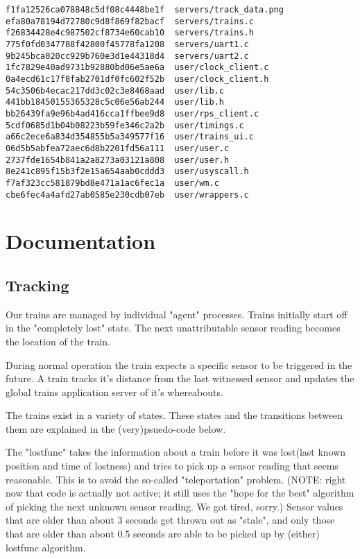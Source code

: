 \documentclass{article}
\begin{document}
\begin{verbatim}
f1fa12526ca078848c5df08c4448be1f  servers/track_data.png
efa80a78194d72780c9d8f869f82bacf  servers/trains.c
f26834428e4c987502cf8734e60cab10  servers/trains.h
775f0fd0347788f42800f45778fa1208  servers/uart1.c
9b245bca020cc929b760e3d1e44318d4  servers/uart2.c
1fc7829e40ad9731b92880bd06e5ae6a  user/clock_client.c
0a4ecd61c17f8fab2701df0fc602f52b  user/clock_client.h
54c3506b4ecac217dd3c02c3e8468aad  user/lib.c
441bb18450155365328c5c06e56ab244  user/lib.h
bb26439fa9e96b4ad416cca1ffbee9d8  user/rps_client.c
5cdf0685d1b04b08223b59fe346c2a2b  user/timings.c
a66c2ece6a834d354855b5a349577f16  user/trains_ui.c
06d5b5abfea72aec6d8b2201fd56a111  user/user.c
2737fde1654b841a2a8273a03121a808  user/user.h
8e241c895f15b3f2e15a654aab0cddd3  user/usyscall.h
f7af323cc581879bd8e471a1ac6fec1a  user/wm.c
cbe6fec4a4afd27ab0585e230cdb07eb  user/wrappers.c
\end{verbatim}

\section{Documentation}

\subsection{Tracking}

Our trains are managed by individual "agent" processes. Trains initially start
off in the "completely lost" state. The next unattributable sensor reading
becomes the location of the train. 

During normal operation the train expects a specific sensor to be triggered in
the future. A train tracks it's distance from the last witnessed sensor and
updates the global trains application server of it's whereabouts.

The trains exist in a variety of states. These states and the transitions
between them are explained in the (very)psuedo-code below.

The "lostfunc" takes the information about a train before it was lost(last known
position and time of lostness) and tries to pick up a sensor reading that seems
reasonable. This is to avoid the so-called "teleportation" problem. (NOTE: right
now that code is actually not active; it still uses the "hope for the best"
algorithm of picking the next unknown sensor reading. We got tired, sorry.)
Sensor values that are older than about 3 seconds get thrown out as "stale", and
only those that are older than about 0.5 seconds are able to be picked up by
(either) lostfunc algorithm.
\end{document}
